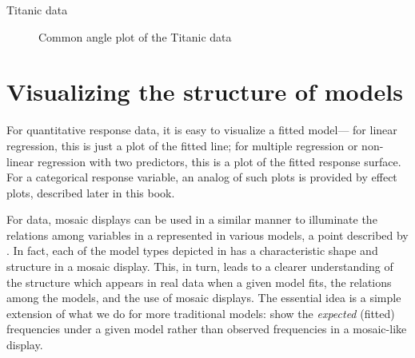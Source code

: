 \documentclass[11pt]{book}\usepackage[]{graphicx}\usepackage[]{color}
\newenvironment{knitrout}{}{} %
\renewenvironment{knitrout}{\small\renewcommand{\baselinestretch}{.85}}{} %
\begin{document}
\begin{Example}{Titanic data}
\begin{knitrout}
\begin{figure}[htbp]
\caption[Common angle plot of the Titanic data]{Common angle plot of the Titanic data\label{fig:titanic-par3}}
\end{figure}


\end{knitrout}



\end{Example}



\section{Visualizing the structure of \loglin models}\label{sec:mosaic-struc}
For quantitative response data, it is easy to visualize a fitted model---
for linear regression, this is just a plot of the fitted line;
for multiple regression or non-linear regression with two predictors,
this is a plot of the fitted response surface.  For a categorical
response variable, an analog of such plots is provided by
effect plots, described later in this book.

For \ctab data,
mosaic displays can be used in a similar manner to illuminate the relations among
variables in a \ctab represented in various \loglin{} models,
a point described by \citet{TheusLauer:99}.
In fact,
each of the model types depicted in  has
a characteristic shape and structure in a mosaic display. This,
in turn, leads to a clearer understanding of the structure which appears
in real data when a given model fits, the relations among the models,
and the use of mosaic displays.  The essential idea is a simple
extension of what we do for more traditional models:
show the \emph{expected} (fitted) frequencies under a given model
rather than observed frequencies in a mosaic-like display.
\end{document}
